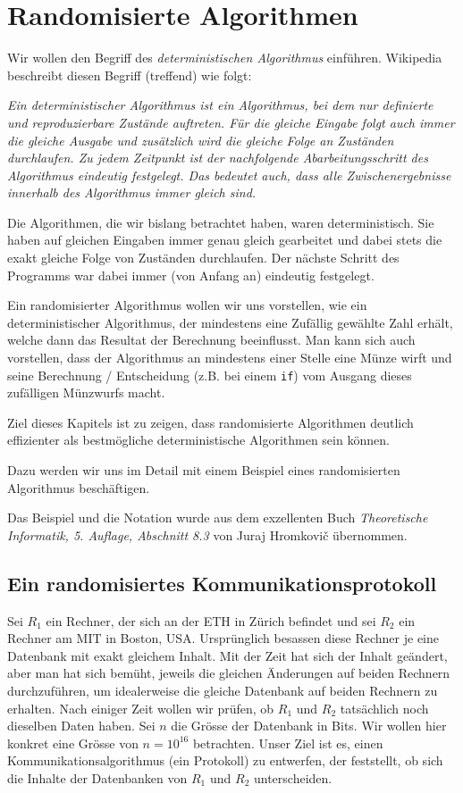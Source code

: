 \chapter{Randomisierte Algorithmen}
Wir wollen den Begriff des \textit{deterministischen Algorithmus} einführen. Wikipedia beschreibt diesen Begriff (treffend) wie folgt:

\textit{Ein deterministischer Algorithmus ist ein Algorithmus, bei dem nur definierte und reproduzierbare Zustände auftreten. Für die gleiche Eingabe folgt auch immer die gleiche Ausgabe und zusätzlich wird die gleiche Folge an Zuständen durchlaufen. Zu jedem Zeitpunkt ist der nachfolgende Abarbeitungsschritt des Algorithmus eindeutig festgelegt. Das bedeutet auch, dass alle Zwischenergebnisse innerhalb des Algorithmus immer gleich sind.}

Die Algorithmen, die wir bislang betrachtet haben, waren deterministisch. Sie haben auf gleichen Eingaben immer genau gleich gearbeitet und dabei stets die exakt gleiche Folge von Zuständen durchlaufen. Der nächste Schritt des Programms war dabei immer (von Anfang an) eindeutig festgelegt.

Ein randomisierter Algorithmus wollen wir uns vorstellen, wie ein deterministischer Algorithmus, der mindestens eine Zufällig gewählte Zahl erhält, welche dann das Resultat der Berechnung beeinflusst. Man kann sich auch vorstellen, dass der Algorithmus an mindestens einer Stelle eine Münze wirft und seine Berechnung / Entscheidung (z.B. bei einem \texttt{if}) vom Ausgang dieses zufälligen Münzwurfs macht.

Ziel dieses Kapitels ist zu zeigen, dass randomisierte Algorithmen deutlich effizienter als bestmögliche deterministische Algorithmen sein können.

Dazu werden wir uns im Detail mit einem Beispiel eines randomisierten Algorithmus beschäftigen.

Das Beispiel und die Notation wurde aus dem exzellenten Buch \textit{Theoretische Informatik, 5. Auflage, Abschnitt 8.3} von Juraj Hromkovi\v{c} übernommen.

\section{Ein randomisiertes Kommunikationsprotokoll}
Sei $R_1$ ein Rechner, der sich an der ETH in Zürich befindet und sei $R_2$ ein Rechner am MIT in Boston, USA. Ursprünglich besassen diese Rechner je eine Datenbank mit exakt gleichem Inhalt. Mit der Zeit hat sich der Inhalt geändert, aber man hat sich bemüht, jeweils die gleichen Änderungen auf beiden Rechnern durchzuführen, um idealerweise die gleiche Datenbank auf beiden Rechnern zu erhalten. Nach einiger Zeit wollen wir prüfen, ob $R_1$ und $R_2$ tatsächlich noch dieselben Daten haben. Sei $n$ die Grösse der Datenbank in Bits. Wir wollen hier konkret eine Grösse von $n = 10^{16}$ betrachten. Unser Ziel ist es, einen Kommunikationsalgorithmus (ein Protokoll) zu
entwerfen, der feststellt, ob sich die Inhalte der Datenbanken von $R_1$ und $R_2$ unterscheiden.

